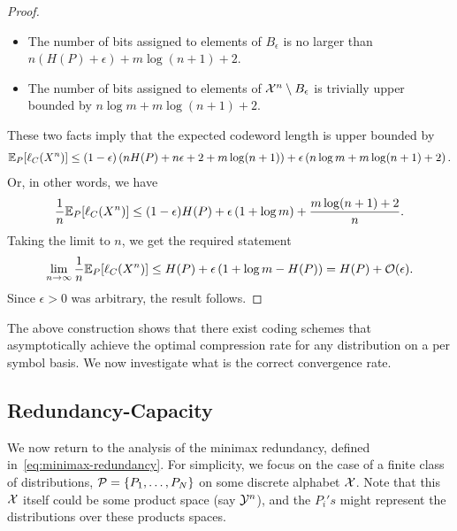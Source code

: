 \begin{proof}
        \begin{itemize}
            \item The number of bits assigned to elements of $B_\epsilon$ is no larger than $n (H(P) + \epsilon) + m \log(n+1) + 2$. 
            \item The number of bits assigned to elements of $\mathcal{X}^n \setminus B_\epsilon$ is trivially upper bounded by $n \log m  + m \log(n+1) + 2$. 
        \end{itemize}
        These two facts imply that the expected codeword length is upper bounded by 
        \begin{align}
            \mathbb{E}_P[\ell_C(X^n)] \leq (1-\epsilon) \left( n H(P) + n \epsilon + 2  + m \log(n+1)\right) + \epsilon \left( n \log m  + m \log (n+1) + 2 \right). 
        \end{align}
        Or, in other words, we have 
        \begin{align}
            \frac{1}{n} \mathbb{E}_P[\ell_C(X^n)] \leq (1-\epsilon) H(P) + \epsilon \left( 1 + \log m \right) + \frac{m \log(n+1) + 2}{n}.  
        \end{align}
        Taking the limit to $n$, we get the required statement 
        \begin{align}
            \lim_{n \to \infty} \frac{1}{n} \mathbb{E}_P[\ell_C(X^n)] \leq H(P) + \epsilon \left(  1 + \log m - H(P) \right) = H(P) + \mathcal{O}(\epsilon). 
        \end{align}
        Since $\epsilon>0$ was arbitrary, the result follows. 
    \end{proof}
    The above construction shows that there exist coding schemes that asymptotically achieve the optimal compression rate for any \iid distribution on a per symbol basis. We now investigate what is the correct convergence rate. 



\subsection{Redundancy-Capacity}
\label{subsec:redundancy-capacity}
    We now return to the analysis of the minimax redundancy, defined in~\eqref{eq:minimax-redundancy}. For simplicity, we focus on the case of a finite class of distributions, $\mathcal{P} = \{P_1, \ldots, P_N\}$ on some discrete alphabet $\mathcal{X}$. Note that this $\mathcal{X}$ itself could be some product space (say $\mathcal{Y}^n$), and the $P_i's$ might represent the distributions over these products spaces. 

